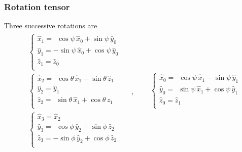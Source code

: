 \documentclass[letterpaper,10pt,english]{jupyterBook}
\begin{document}
\subsubsection{Rotation tensor}
\label{\detokenize{ch/kinematics-rotations-param-euler:rotation-tensor}}\label{\detokenize{ch/kinematics-rotations-param-euler:classical-mechanics-kinematics-rotations-euler-rotation-tensor}}
\sphinxAtStartPar
Three successive rotations are
\begin{equation*}
\begin{split}
\begin{aligned}
& \begin{cases}
 \hat{x}_1 = \ \ \cos \psi \, \hat{x}_0 + \sin \psi \, \hat{y}_0 \\
 \hat{y}_1 = -   \sin \psi \, \hat{x}_0 + \cos \psi \, \hat{y}_0 \\
 \hat{z}_1 =                  \hat{z}_0                          \\
\end{cases} \\
& \begin{cases}
 \hat{x}_2 = \ \ \cos \theta \, \hat{x}_1 - \sin \theta \, \hat{z}_1  \\
 \hat{y}_2 =                    \hat{y}_1                             \\
 \hat{z}_2 = \ \ \sin \theta \, \hat{x}_1 + \cos \theta \, \hat{z}_1  \\
\end{cases} \\
& \begin{cases}
 \hat{x}_3 =                  \hat{x}_2                          \\ 
 \hat{y}_3 = \ \ \cos \phi \, \hat{y}_2 + \sin \phi \, \hat{z}_2 \\
 \hat{z}_3 = -   \sin \phi \, \hat{y}_2 + \cos \phi \, \hat{z}_2 \\ 
\end{cases} \\
\end{aligned}
\quad , \quad
\begin{aligned}
& \begin{cases}
 \hat{x}_0 = \ \ \cos \psi \, \hat{x}_1 - \sin \psi \, \hat{y}_1 \\
 \hat{y}_0 = \ \ \sin \psi \, \hat{x}_1 + \cos \psi \, \hat{y}_1 \\
 \hat{z}_0 =                  \hat{z}_1                          \\
\end{cases} \\

\end{aligned}
\end{split}
\end{equation*}
\end{document}
